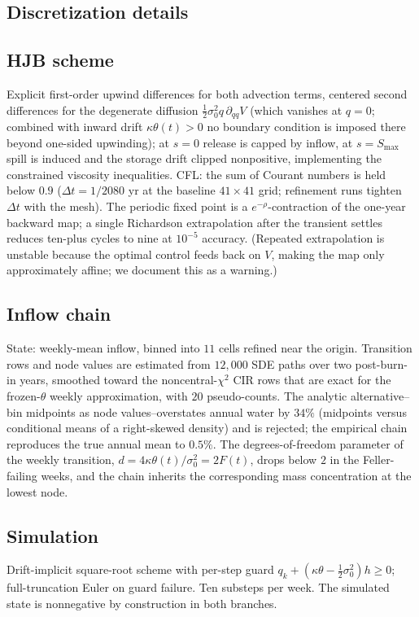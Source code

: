 \documentclass[pdflatex,sn-mathphys-num]{sn-jnl}
\theoremstyle{thmstyleone}
\theoremstyle{thmstyletwo}
\theoremstyle{thmstylethree}
\begin{document}
\begin{appendices}

\section{Discretization details}
\label{app:chain}

\subsection*{HJB scheme} Explicit first-order upwind differences for both
advection terms, centered second differences for the degenerate
diffusion $\tfrac12\sigma_0^2 q\,\partial_{qq}V$ (which vanishes at
$q=0$; combined with inward drift $\kappa\theta(t)>0$ no boundary
condition is imposed there beyond one-sided upwinding); at $s=0$ release
is capped by inflow, at $s=S_{\max}$ spill is induced and the storage
drift clipped nonpositive, implementing the constrained viscosity
inequalities. CFL: the sum of Courant numbers is held below $0.9$
($\Delta t = 1/2080$ yr at the baseline $41\times41$ grid; refinement runs tighten $\Delta t$ with the mesh). The periodic fixed point
is a $e^{-\rho}$-contraction of the one-year backward map; a single
Richardson extrapolation after the transient settles reduces ten-plus
cycles to nine at $10^{-5}$ accuracy. (Repeated extrapolation is
unstable because the optimal control feeds back on $V$, making the map
only approximately affine; we document this as a warning.)

\subsection*{Inflow chain} State: weekly-mean inflow, binned into $11$
cells refined near the origin. Transition rows and node values are
estimated from $12{,}000$ SDE paths over two post-burn-in years,
smoothed toward the noncentral-$\chi^2$ CIR rows that are exact for the
frozen-$\theta$ weekly approximation, with $20$ pseudo-counts. The analytic alternative--
bin midpoints as node values--overstates annual water by $34\%$
(midpoints versus conditional means of a right-skewed density) and is
rejected; the empirical chain reproduces the true annual mean to
$0.5\%$. The degrees-of-freedom parameter of the weekly transition,
$d = 4\kappa\theta(t)/\sigma_0^2 = 2F(t)$, drops below $2$ in the
Feller-failing weeks, and the chain inherits the corresponding mass
concentration at the lowest node.

\subsection*{Simulation} Drift-implicit square-root scheme
\citep{alfonsi2005} with per-step guard
$q_k + (\kappa\theta - \tfrac12\sigma_0^2)h \ge 0$; full-truncation
Euler \citep{lord2010} on guard failure. Ten substeps per week. The
simulated state is nonnegative by construction in both branches.


\end{appendices}
\end{document}
